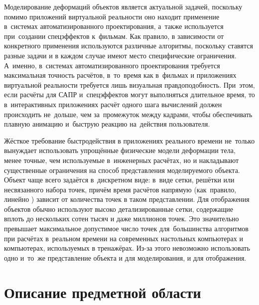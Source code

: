 \documentclass[a4paper, 14pt, titlepage]{extarticle}
\begin{document}
    Моделирование деформаций объектов является актуальной задачей, поскольку помимо приложений
    виртуальной реальности оно находит применение в~системах автоматизированного проектирования, а~также используется
    при~создании спецэффектов к~фильмам.  Как правило, в зависимости от конкретного применения
    используются различные алгоритмы, поскольку ставятся разные задачи и в каждом случае имеют место
    специфические ограничения. А~именно, в~системах автоматизированного проектирования требуется
    максимальная точность расчётов, в~то~время как в~фильмах и приложениях виртуальной реальности
    требуется лишь визуальная правдоподобность. При~этом, если расчёты для САПР и~спецэффектов могут
    выполняться длительное время, то в~интерактивных приложениях расчёт одного шага вычислений должен
    происходить не~дольше, чем за~промежуток между кадрами, чтобы обеспечивать плавную анимацию
    и~быструю реакцию на~действия пользователя.

    Жёсткое требование быстродействия в приложениях реального времени не~только вынуждает
    использовать упрощённые физические модели деформации тела, менее точные, чем используемые
    в~инженерных расчётах, но и накладывают существенные ограничения на способ представления
    моделируемого объекта. Объект чаще всего задаётся в~дискретном виде: в~виде сетки, решётки или
    несвязанного набора точек, причём время расчётов напрямую (как~правило, линейно
    \cite{mueller-meshless}) зависит от количества точек в таком представлении. Для отображения
    объектов обычно используют высоко детализированные сетки, содержащие вплоть до нескольких
    сотен тысяч и даже миллионов точек. Это значительно превышает максимальное допустимое число точек для~большинства
    алгоритмов \cite{mueller-stable, mueller-meshless, chang-crash} при расчётах в~реальном времени на
    современных настольных компьютерах и компьютерах, используемых в тренажёрах. Из-за этого
    невозможно использовать одно и~то~же представление объекта и для моделирования, и для
    отображения.

  \section{Описание предметной области}\label{domain}
\end{document}
